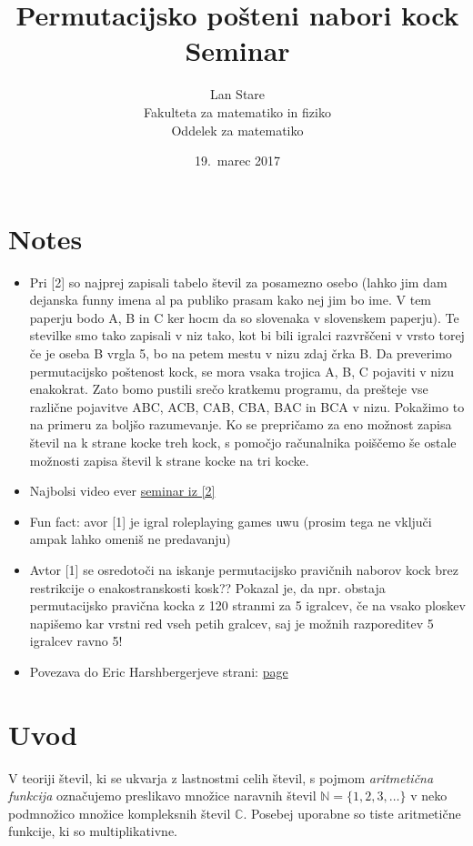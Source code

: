 \documentclass[a4paper,12pt]{article}
\title{Permutacijsko pošteni nabori kock \\ 
\Large Seminar}
\author{Lan Stare \\
Fakulteta za matematiko in fiziko \\
Oddelek za matematiko}
\date{19.\ marec 2017}
\def\N{\mathbb{N}} %
\def\C{\mathbb{C}} %
\begin{document}


\maketitle



\section{Notes}
\begin{itemize}
    \item Pri [2] so najprej zapisali tabelo števil za posamezno osebo (lahko jim dam dejanska funny imena al pa publiko prasam kako nej jim bo ime. V tem paperju bodo A, B in C ker hocm da so slovenaka v slovenskem paperju). Te stevilke smo tako zapisali v niz tako, kot bi bili igralci razvrščeni v vrsto torej če je oseba B vrgla 5, bo na petem mestu v nizu zdaj črka B. Da preverimo permutacijsko poštenost kock, se mora vsaka trojica {A, B, C} pojaviti v nizu enakokrat. Zato bomo pustili srečo kratkemu programu, da prešteje vse različne pojavitve ABC, ACB, CAB, CBA, BAC in BCA v nizu. Pokažimo to na primeru za boljšo razumevanje. Ko se prepričamo za eno možnost zapisa števil na k strane kocke treh kock, s pomočjo računalnika poiščemo še ostale možnosti zapisa števil k strane kocke na tri kocke.
    \item Najbolsi video ever \href{https://www.youtube.com/watch?v=L3d0YIW7wHU&t=1s}{seminar iz [2]}
    \item Fun fact: avor [1] je igral roleplaying games uwu (prosim tega ne vključi ampak lahko omeniš ne predavanju)
    \item Avtor [1] se osredotoči na iskanje permutacijsko pravičnih naborov kock brez restrikcije o enakostranskosti kosk?? Pokazal je, da npr. obstaja permutacijsko pravična kocka z 120 stranmi za 5 igralcev, če na vsako ploskev napišemo kar vrstni red vseh petih gralcev, saj je možnih razporeditev 5 igralcev ravno 5!
    \item Povezava do Eric Harshbergerjeve strani: \href{http://www.ericharshbarger.org}{page}
\end{itemize}
\section{Uvod}

V teoriji števil, ki se ukvarja z lastnostmi celih števil, s pojmom {\em aritmetična funkcija}
označujemo preslikavo množice naravnih števil $\N = \{1,2,3,\ldots\}$ v neko podmnožico
množice kompleksnih števil $\C$.
Posebej uporabne so tiste aritmetične funkcije, ki so multiplikativne.
\end{document}
